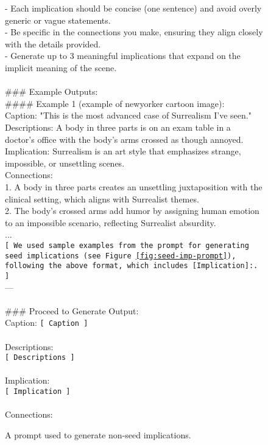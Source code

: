 \begin{figure*}[t]
\begin{tcolorbox}
- Each implication should be concise (one sentence) and avoid overly generic or vague statements.\\
- Be specific in the connections you make, ensuring they align closely with the details provided.\\
- Generate up to 3 meaningful implications that expand on the implicit meaning of the scene.\\
\\
\#\#\# Example Outputs:\\
\#\#\#\# Example 1 (example of newyorker cartoon image):\\
\text{[}Caption\text{]}: "This is the most advanced case of Surrealism I've seen."\\
\text{[}Descriptions\text{]}: A body in three parts is on an exam table in a doctor's office with the body's arms crossed as though annoyed.\\
\text{[}Implication\text{]}: Surrealism is an art style that emphasizes strange, impossible, or unsettling scenes.\\
\text{[}Connections\text{]}:\\
1. A body in three parts creates an unsettling juxtaposition with the clinical setting, which aligns with Surrealist themes.\\
2. The body’s crossed arms add humor by assigning human emotion to an impossible scenario, reflecting Surrealist absurdity.\\
... \\
\texttt{[ We used sample examples from the prompt for generating seed implications (see Figure \ref{fig:seed-imp-prompt}), following the above format, which includes [Implication]:. ]}
\\
---\\
\\
\#\#\# Proceed to Generate Output:\\
\text{[}Caption\text{]}: \texttt{[ Caption ]}\\
\\
\text{[}Descriptions\text{]}:\\
\texttt{[ Descriptions ]}\\
\\
\text{[}Implication\text{]}:\\
\texttt{[ Implication ]}\\
\\
\text{[}Connections\text{]}:
\end{tcolorbox}
\caption{A prompt used to generate non-seed implications.} %
\label{fig:nonseed-imp-prompt}
\end{figure*}


